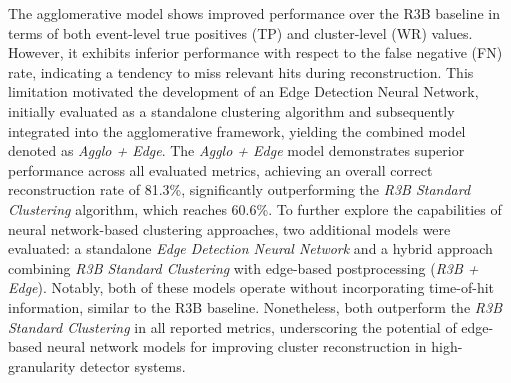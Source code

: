 \documentclass[final,5p,times,twocolumn]{elsarticle}
\newcommand{\kms}{km\,s$^{-1}$}
\begin{document}
The agglomerative model shows improved performance over the R3B baseline in terms of both event-level true positives (TP) and cluster-level (WR) values. However, it exhibits inferior performance with respect to the false negative (FN) rate, indicating a tendency to miss relevant hits during reconstruction. This limitation motivated the development of an Edge Detection Neural Network, initially evaluated as a standalone clustering algorithm and subsequently integrated into the agglomerative framework, yielding the combined model denoted as \textit{Agglo + Edge}.\newline
The \textit{Agglo + Edge} model demonstrates superior performance across all evaluated metrics, achieving an overall correct reconstruction rate of 81.3\%, significantly outperforming the \textit{R3B Standard Clustering} algorithm, which reaches 60.6\%.\newline
To further explore the capabilities of neural network-based clustering approaches, two additional models were evaluated: a standalone \textit{Edge Detection Neural Network} and a hybrid approach combining \textit{R3B Standard Clustering} with edge-based postprocessing (\textit{R3B + Edge}). Notably, both of these models operate without incorporating time-of-hit information, similar to the R3B baseline. Nonetheless, both outperform the \textit{R3B Standard Clustering} in all reported metrics, underscoring the potential of edge-based neural network models for improving cluster reconstruction in high-granularity detector systems.




\end{document}
